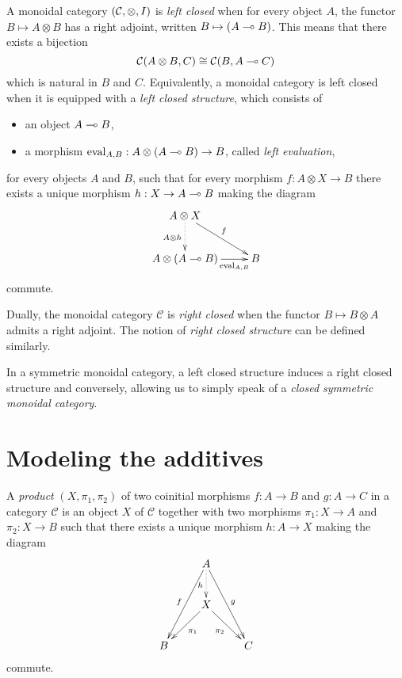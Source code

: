 \begin{definition}
A monoidal category $(\mathcal{C},\otimes,I)$ is \emph{left closed} when for every object $A$, the functor $B\mapsto A\otimes B$ has a right adjoint, written $B\mapsto(A\multimap B)$.
This means that there exists a bijection
\begin{equation*}
\mathcal{C}(A\otimes B, C) \cong \mathcal{C}(B,A\multimap C)
\end{equation*}
which is natural in $B$ and $C$.
Equivalently, a monoidal category is left closed when it is equipped with a \emph{left closed structure}, which consists of
\begin{itemize}
\item an object $A\multimap B$,
\item a morphism $\mathrm{eval}_{A,B}:A\otimes (A\multimap B)\to B$, called \emph{left evaluation},
\end{itemize}
for every objects $A$ and $B$, such that for every morphism $f:A\otimes X\to B$ there exists a unique morphism $h:X\to A\multimap B$ making the diagram
\begin{equation*}
\xymatrix{
A\tens X\ar@{.>}[d]_{A\tens h}\ar[dr]^{f}\\
A\tens(A\limp B)\ar[r]_-{\mathrm{eval}_{A,B}}& B
}
\end{equation*}
commute.

Dually, the monoidal category $\mathcal{C}$ is \emph{right closed} when the functor $B\mapsto B\otimes A$ admits a right adjoint. The notion of \emph{right closed structure} can be defined similarly.
\end{definition}

In a symmetric monoidal category, a left closed structure induces a
right closed structure and conversely, allowing us to simply speak of a
\emph{closed symmetric monoidal category}.

\section{Modeling the additives}\label{modeling-the-additives}

\begin{definition}[Product]
A \emph{product} $(X,\pi_1,\pi_2)$ of two coinitial morphisms $f:A\to B$ and $g:A\to C$ in a category $\mathcal{C}$ is an object $X$ of $\mathcal{C}$ together with two morphisms $\pi_1:X\to A$ and $\pi_2:X\to B$ such that there exists a unique morphism $h:A\to X$ making the diagram
\begin{equation*}
\xymatrix{
& \ar[ddl]_fA\ar@{.>}[d]_h\ar[ddr]^g& \\
& \ar[dl]^{\pi_1}X\ar[dr]_{\pi_2}& \\
B& & C
}
\end{equation*}
commute.
\end{definition}


